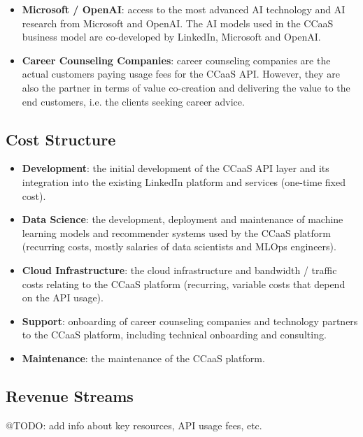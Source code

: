 \begin{itemize}
    \item \textbf{Microsoft / OpenAI}: access to the most advanced AI technology and AI research
        from Microsoft and OpenAI. The AI models used in the CCaaS business model are co-developed
        by LinkedIn, Microsoft and OpenAI.
    \item \textbf{Career Counseling Companies}: career counseling companies are the actual customers
        paying usage fees for the CCaaS API. However, they are also the partner in terms of value 
        co-creation and delivering the value to the end customers, i.e. the clients seeking career
        advice. 
\end{itemize}

\subsection{Cost Structure}

\begin{itemize}
    \item \textbf{Development}: the initial development of the CCaaS API layer and its integration into the
            existing LinkedIn platform and services (one-time fixed cost). 
    \item \textbf{Data Science}: the development, deployment and maintenance of machine learning
        models and recommender systems used by the CCaaS platform (recurring costs, mostly salaries 
        of data scientists and MLOps engineers).
    \item \textbf{Cloud Infrastructure}: the cloud infrastructure and bandwidth / traffic costs 
        relating to the CCaaS platform (recurring, variable costs that depend on the API usage).
    \item \textbf{Support}: onboarding of career counseling companies and technology partners
        to the CCaaS platform, including technical onboarding and consulting.
    \item \textbf{Maintenance}: the maintenance of the CCaaS platform.
\end{itemize}

\subsection{Revenue Streams}

{\color{red} @TODO: add info about key resources, API usage fees, etc.}
